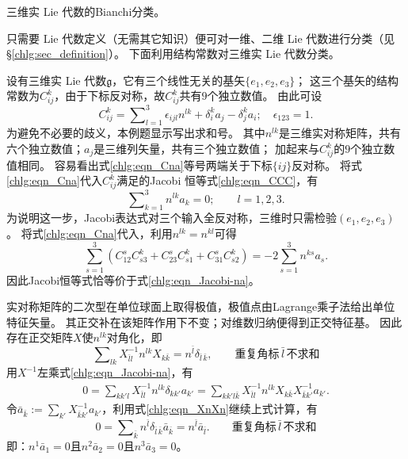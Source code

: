 \begin{example}
	三维实 Lie 代数的Bianchi分类。
\end{example}

只需要 Lie 代数定义（无需其它知识）便可对一维、二维 Lie 代数进行分类（见\S\ref{chlg:sec_definition}）。
下面利用结构常数对三维实 Lie 代数分类。

设有三维实 Lie 代数$\mathfrak{g}$，它有三个线性无关的基矢$\{e_1,e_2,e_3\}$；
这三个基矢的结构常数为$C^k_{ij}$，由于下标反对称，故$C^k_{ij}$共有$9$个独立数值。
由此可设
\begin{equation}\label{chlg:eqn_Cna}
	C^k_{ij} = \sum\nolimits_{l=1}^{3}\epsilon_{ijl} n^{lk} + \delta^k_i a_j - \delta^k_j a_i ;
	\quad \epsilon_{123} =1.
\end{equation}
为避免不必要的歧义，本例题显示写出求和号。
其中$n^{lk}$是三维实对称矩阵，共有六个独立数值；$a_j$是三维列矢量，共有三个独立数值；
加起来与$C^k_{ij}$的$9$个独立数值相同。
容易看出式\eqref{chlg:eqn_Cna}等号两端关于下标$\{ij\}$反对称。
将式\eqref{chlg:eqn_Cna}代入$C^k_{ij}$满足的Jacobi 恒等式\eqref{chlg:eqn_CCC}，有
\begin{equation}\label{chlg:eqn_Jacobi-na}
	\sum\nolimits_{k=1}^{3}n^{lk} a_k =0;\qquad l=1,2,3.
\end{equation}
为说明这一步，Jacobi表达式对三个输入全反对称，三维时只需检验$(e_1,e_2,e_3)$。
将式\eqref{chlg:eqn_Cna}代入，利用$n^{lk}=n^{kl}$可得
\[
 \sum_{s=1}^3\left(C^s_{12}C^k_{s3}+C^s_{23}C^k_{s1}+C^s_{31}C^k_{s2}\right)
 =-2\sum_{s=1}^3 n^{ks}a_s .
\]
因此Jacobi恒等式恰等价于式\eqref{chlg:eqn_Jacobi-na}。

实对称矩阵的二次型在单位球面上取得极值，极值点由Lagrange乘子法给出单位特征矢量。
其正交补在该矩阵作用下不变；对维数归纳便得到正交特征基。
因此存在正交矩阵$X$使$n^{lk}$对角化，即
\begin{equation}\label{chlg:eqn_XnXn}
	\sum\nolimits_{l k}X^{-1}_{\bar{l} l} n^{lk} X_{k \bar{k}}= n^{\bar{l}} \delta_{\bar{l}\, \bar{k}},
	\qquad \text{重复角标}\,\bar{l}\,\text{不求和}
\end{equation}
用$X^{-1}$左乘式\eqref{chlg:eqn_Jacobi-na}，有
\begin{align*}
	0= \sum\nolimits_{kk'l} X^{-1}_{\bar{l} l} n^{lk} \delta_{k k'} a_{k'}
	=\sum\nolimits_{kk'l\bar{k}} X^{-1}_{\bar{l} l} n^{lk} X_{k \bar{k}}  X^{-1}_{\bar{k} k'} a_{k'} .
\end{align*}
令$\bar{a}_{\bar{k}} := \sum_{k'}X^{-1}_{\bar{k} k'} a_{k'}$，利用式\eqref{chlg:eqn_XnXn}继续上式计算，有
\begin{equation}\label{chlg:eqn_Dnakb}
	0=\sum\nolimits_{\bar{k}} n^{\bar{l}} \delta_{\bar{l}\, \bar{k}}  \bar{a}_{\bar{k}}
	= n^{\bar{l}} \bar{a}_{\bar{l}}. 	\qquad \text{重复角标}\,\bar{l}\,\text{不求和}
\end{equation}
即：$n^1 \bar{a}_1 = 0$且$n^2 \bar{a}_2 = 0$且$n^3 \bar{a}_3 = 0$。

